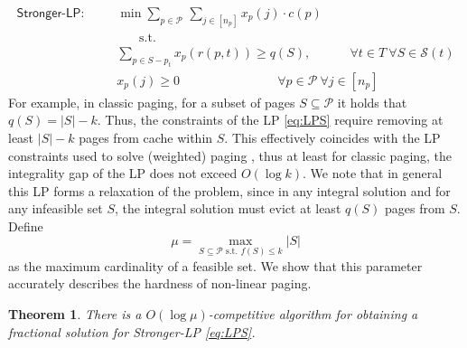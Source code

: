 \documentclass[11pt]{article}
\newcommand{\cP}{{\mathcal{P}}}
\newcommand{\cS}{{\mathcal{S}}}
\newtheorem{theorem}[thm]{Theorem}
\begin{document}
{\begin{equation}
	\label{eq:LPS}
	\begin{aligned}
		\textsf{Stronger-LP}:~~~~~~~~	& \min \sum_{p \in \cP~} \sum_{j \in [n_p]}  x_p(j) \cdot c(p)\\
		& ~~~~~~~~\text{s.t. }\\
		& \sum_{p \in S-p_t} x_p(r(p,t)) \geq q(S), 	~~~~~~~~~~~~~~\forall t \in T~\forall S  \in \cS(t) \\ 
		& x_p(j) \geq 0 ~~~~~~~~~~~~~~~~~~~~~~~~~~~~~~~~~~~	\forall p \in \cP~\forall j \in [n_p]
	\end{aligned}
\end{equation} For example, in classic paging, for a subset of pages $S \subseteq \cP$ it holds that $q(S) = |S|-k$. Thus, the constraints of the LP \eqref{eq:LPS} require removing at least $|S|-k$ pages from cache within $S$. This effectively coincides with the LP constraints used to solve (weighted) paging \cite{bansal2012primal}, thus at least for classic paging, the integrality gap of the LP does not exceed $O(\log k)$. We note that in general this LP forms a relaxation of the problem, since in any integral solution and for any infeasible set $S$, the integral solution must evict at least $q(S)$ pages from $S$. %
Define 
\begin{equation}
	\label{eq:mu}
	\mu = \max_{S \subseteq \cP \text{ s.t. } f(S) \leq k} |S|
\end{equation} as the maximum cardinality of a feasible set. We show that this parameter accurately describes the hardness of non-linear paging. %

\begin{theorem}
	\label{thm:MU}
	There is a $O\left(\log \mu\right)$-competitive algorithm for obtaining a fractional solution for \textnormal{\textsf{Stronger-LP}} \eqref{eq:LPS}. 
\end{theorem}


}
\end{document}

